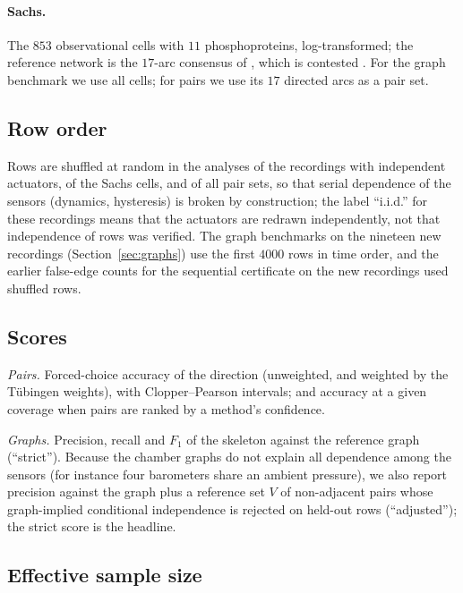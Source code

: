 \paragraph{Sachs.} The $853$ observational cells with $11$ phosphoproteins, log-transformed;
the reference network is the $17$-arc consensus of \citet{sachs2005causal}, which is
contested \citep{mooij2020joint}. For the graph benchmark we use all cells; for pairs we use
its $17$ directed arcs as a pair set.

\subsection{Row order}\label{sec:order}

Rows are shuffled at random in the analyses of the recordings with independent actuators, of the Sachs
cells, and of all pair sets, so that serial dependence of the sensors (dynamics, hysteresis) is broken
by construction; the label ``i.i.d.'' for these recordings means that the actuators are redrawn
independently, not that independence of rows was verified. The graph benchmarks on the nineteen new
recordings (Section~\ref{sec:graphs}) use the first $4000$ rows in time order, and the earlier
false-edge counts for the sequential certificate on the new recordings used shuffled rows.

\subsection{Scores}

\emph{Pairs.} Forced-choice accuracy of the direction (unweighted, and weighted by the
Tübingen weights), with Clopper--Pearson intervals; and accuracy at a given coverage when
pairs are ranked by a method's confidence.

\emph{Graphs.} Precision, recall and $F_1$ of the skeleton against the reference graph
(``strict''). Because the chamber graphs do not explain all dependence among the sensors
(for instance four barometers share an ambient pressure), we also report precision against
the graph plus a reference set $V$ of non-adjacent pairs whose graph-implied conditional
independence is rejected on held-out rows (``adjusted''); the strict score is the headline.

\subsection{Effective sample size}\label{sec:ess}

